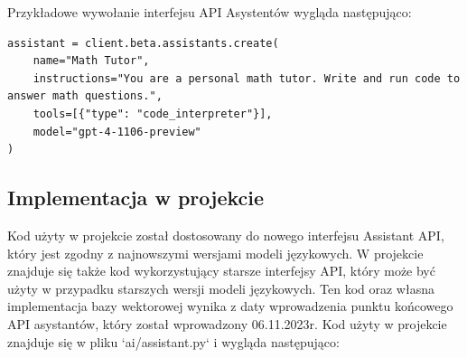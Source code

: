 \begin{enumerate}
        Przykładowe wywołanie interfejsu API Asystentów wygląda następująco:
        \begin{listing}
            \begin{verbatim}
assistant = client.beta.assistants.create(
    name="Math Tutor",
    instructions="You are a personal math tutor. Write and run code to answer math questions.",
    tools=[{"type": "code_interpreter"}],
    model="gpt-4-1106-preview"
)
            \end{verbatim}
        \end{listing}
\end{enumerate}

\subsection{Implementacja w projekcie}
Kod użyty w projekcie został dostosowany do nowego interfejsu Assistant API, który jest zgodny z najnowszymi wersjami modeli językowych. W projekcie znajduje się także kod wykorzystujący starsze interfejsy API, który może być użyty w przypadku starszych wersji modeli językowych. Ten kod oraz własna implementacja bazy wektorowej wynika z daty wprowadzenia punktu końcowego API asystantów, który został wprowadzony 06.11.2023r.
Kod użyty w projekcie znajduje się w pliku `ai/assistant.py` i wygląda następująco:

